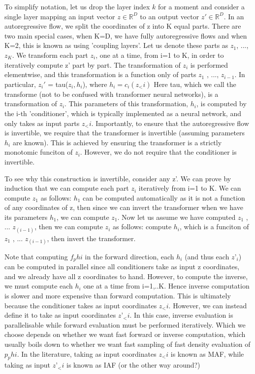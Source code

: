 \documentclass[12pt,a4paper]{report}
\begin{document}
To simplify notation, let us drop the layer index $k$ for a moment and consider a single layer mapping an input vector $z\in \mathbb{R}^D$ to an output vector $z' \in \mathbb{R}^D$. 
In an autoregressive flow, we split the coordinates of z into K equal parts. 
There are two main special cases, when K=D, we have fully autoregressive flows and when K=2, this is known as using 'coupling layers'.
Let us denote these parts as $z_1$, ..., $z_K$. %
We transform each part $z_i$, one at a time, from i=1 to K, in order to iteratively compute z' part by part. 
The transformation of $z_i$ is performed elementwise, and this transformation is a function only of parts $z_1$ , ..., $z_{i-1}$. 
In particular, 
$z_i'$ = tau($z_i, h_i$), where $h_i = c_i(z_<i)$
Here tau, which we call the transforme (not to be confused with transformer neural networks), is a transformation of $z_i$. 
This parameters of this transformation, $h_i$, is computed by the i-th 'conditioner', which is typically implemented as a neural network, and only takes as input parts $z_<i$. 
Importantly, to ensure that the autoregressive flow is invertible, we require that the transformer is invertible (assuming parameters $h_i$ are known). This is achieved by ensuring the transformer is a strictly monotomic funciton of $z_i$. 
However, we do not require that the conditioner is invertible. 

To see why this construction is invertible, consider any z'. 
We can prove by induction that we can compute each part $z_i$ iteratively from i=1 to K. 
We can compute $z_1$ as follows: $h_1$ can be computed automatically as it is not a function of any coordinates of z, then since we can invert the transformer when we have its parameters $h_1$, we can compute $z_1$. 
Now let us assume we have computed $z_1$ , ... $z_(i-1)$, then we can compute $z_i$ as follows: compute $h_i$, which is a funciton of $z_1$ , ... $z_(i-1)$, then invert the transformer. %

Note that computing $f_phi$ in the forward direction, each $h_i$ (and thus each $z’_i$) can be computed in parallel since all conditioners take as input z coordinates, and we already have all z coordinates to hand. 
However, to compute the inverse, we must compute each $h_i$ one at a time from i=1,..K. Hence inverse computation is slower and more expensive than forward computation. 
This is ultimately because the conditioner takes as input coordinates $z_<i$. 
However, we can instead define it to take as input coordinates $z’_<i$. 
In this case, inverse evaluation is parallelisable while forward evaluation must be performed iteratively. 
Which we choose depends on whether we want fast forward or inverse computation, which usually boils down to whether we want fast sampling of fast density evaluation of $p_phi$. 
In the literature, taking as input coordinates $z_<i$ is known as MAF, while taking as input $z’_<i$ is known as IAF (or the other way around?)
\end{document}
